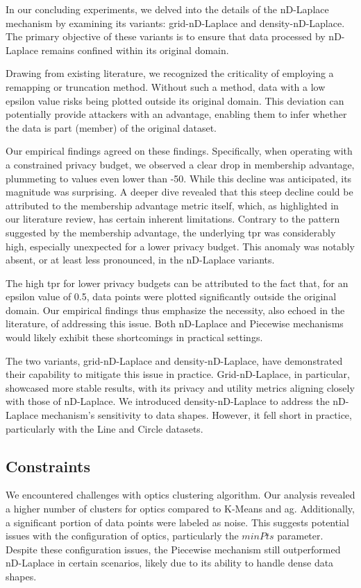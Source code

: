 In our concluding experiments, we delved into the details of the nD-Laplace mechanism by examining its variants: grid-nD-Laplace and density-nD-Laplace. The primary objective of these variants is to ensure that data processed by nD-Laplace remains confined within its original domain.

Drawing from existing literature, we recognized the criticality of employing a remapping or truncation method. Without such a method, data with a low epsilon value risks being plotted outside its original domain. This deviation can potentially provide attackers with an advantage, enabling them to infer whether the data is part (member) of the original dataset.

Our empirical findings agreed on these findings. Specifically, when operating with a constrained privacy budget, we observed a clear drop in membership advantage, plummeting to values even lower than -50. While this decline was anticipated, its magnitude was surprising. A deeper dive revealed that this steep decline could be attributed to the membership advantage metric itself, which, as highlighted in our literature review, has certain inherent limitations. Contrary to the pattern suggested by the membership advantage, the underlying \gls{tpr} was considerably high, especially unexpected for a lower privacy budget. This anomaly was notably absent, or at least less pronounced, in the nD-Laplace variants. 

The high \gls{tpr} for lower privacy budgets can be attributed to the fact that, for an epsilon value of 0.5, data points were plotted significantly outside the original domain. Our empirical findings thus emphasize the necessity, also echoed in the literature, of addressing this issue. Both nD-Laplace and Piecewise mechanisms would likely exhibit these shortcomings in practical settings.

The two variants, grid-nD-Laplace and density-nD-Laplace, have demonstrated their capability to mitigate this issue in practice. Grid-nD-Laplace, in particular, showcased more stable results, with its privacy and utility metrics aligning closely with those of nD-Laplace. We introduced density-nD-Laplace to address the nD-Laplace mechanism's sensitivity to data shapes. However, it fell short in practice, particularly with the Line and Circle datasets.

\subsection{Constraints}
We encountered challenges with \gls{optics} clustering algorithm.
Our analysis revealed a higher number of clusters for \gls{optics} compared to K-Means and \gls{ag}. Additionally, a significant portion of data points were labeled as noise. This suggests potential issues with the configuration of \gls{optics}, particularly the $minPts$ parameter. Despite these configuration issues, the Piecewise mechanism still outperformed nD-Laplace in certain scenarios, likely due to its ability to handle dense data shapes.
